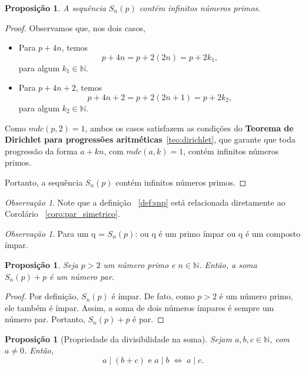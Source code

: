 \documentclass[a4paper,11pt]{article}
\newtheorem{proposition}[theorem]{Proposição}
\theoremstyle{definition}
\theoremstyle{remark}
\newtheorem{remark}[theorem]{Observação}
\begin{document}
\begin{otherlanguage}{brazil}
	\vspace{0.5cm}
	
	\begin{proposition}
		A sequência \(S_n(p)\) contém infinitos números primos.
	\end{proposition}
	
	\begin{proof}
		Observamos que, nos dois casos,
		\begin{itemize}
			\item Para \(p + 4n\), temos
			\[
			p + 4n = p + 2(2n) = p + 2k_1,
			\]
			para algum \(k_1 \in \mathbb{N}\).
			
			\item Para \(p + 4n + 2\), temos
			\[
			p + 4n + 2 = p + 2(2n + 1) = p + 2k_2,
			\]
			para algum \(k_2 \in \mathbb{N}\).
		\end{itemize}
		
		Como \(mdc(p, 2) = 1\), ambos os casos satisfazem as condições do  \textbf{Teorema de Dirichlet para progressões aritméticas}~\ref{teo:dirichlet}, que garante que toda progressão da forma \(a + kn\), com \(mdc(a, k) = 1\), contém infinitos números primos.
		
		Portanto, a sequência \(S_n(p)\) contém infinitos números primos.
	\end{proof}
	
	\begin{remark}
		Note que a definição ~\ref{def:snp} está relacionada diretamente ao Corolário ~\ref{coro:par_simetrico}.
	\end{remark}
	
	\begin{remark}
		Para um q = \(S_n(p)\): ou q é um primo ímpar ou q é um composto ímpar.
	\end{remark}
	
	\begin{proposition}
		Seja \( p > 2 \) um número primo e \( n \in \mathbb{N} \). Então, a soma \( S_n(p) + p \) é um número par.
	\end{proposition}
	
	
	\begin{proof}
		Por definição, \( S_n(p) \) é ímpar. De fato, como \( p > 2 \) é um número primo, ele também é ímpar. Assim, a soma de dois números ímpares é sempre um número par. Portanto, \( S_n(p) + p \) é par. 
	\end{proof}
	
	\begin{proposition}[Propriedade da divisibilidade na soma]\label{prop:divisibilidade_na_soma}
		Sejam \( a, b, c \in \mathbb{N} \), com \( a \neq 0 \). Então,
		\[
		a \mid (b + c) \text{ e } a \mid b \;\Longleftrightarrow\; a \mid c.
		\]
	\end{proposition}
	

\end{otherlanguage}
\end{document}
